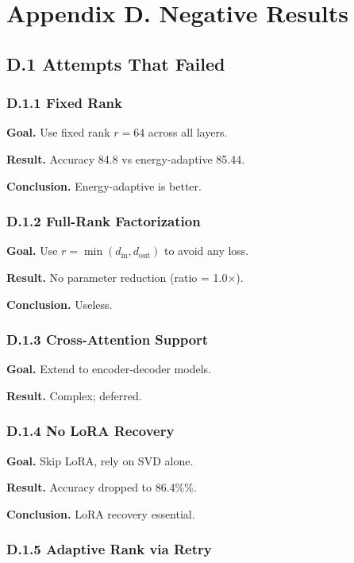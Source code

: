 
\section{Appendix D. Negative Results}

\subsection{D.1 Attempts That Failed}

\subsubsection{D.1.1 Fixed Rank}

\textbf{Goal.} Use fixed rank $r = 64$ across all layers.

\textbf{Result.} Accuracy 84.8 vs energy-adaptive 85.44.

\textbf{Conclusion.} Energy-adaptive is better.

\subsubsection{D.1.2 Full-Rank Factorization}

\textbf{Goal.} Use $r = \min(d_\text{in}, d_\text{out})$ to avoid any loss.

\textbf{Result.} No parameter reduction (ratio = 1.0$\times$).

\textbf{Conclusion.} Useless.

\subsubsection{D.1.3 Cross-Attention Support}

\textbf{Goal.} Extend to encoder-decoder models.

\textbf{Result.} Complex; deferred.

\subsubsection{D.1.4 No LoRA Recovery}

\textbf{Goal.} Skip LoRA, rely on SVD alone.

\textbf{Result.} Accuracy dropped to 86.4\%\%.

\textbf{Conclusion.} LoRA recovery essential.

\subsubsection{D.1.5 Adaptive Rank via Retry}

